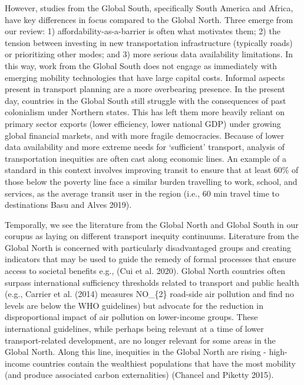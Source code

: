 \documentclass[12pt, oneside]{report}
\begin{document}
However, studies from the Global South, specifically South America and
Africa, have key differences in focus compared to the Global North.
Three emerge from our review: 1) affordability-as-a-barrier is often
what motivates them; 2) the tension between investing in new
transportation infrastructure (typically roads) or prioritizing other
modes; and 3) more serious data availability limitations. In this way,
work from the Global South does not engage as immediately with emerging
mobility technologies that have large capital costs. Informal aspects
present in transport planning are a more overbearing presence. In the
present day, countries in the Global South still struggle with the
consequences of past colonialism under Northern states. This has left
them more heavily reliant on primary sector exports (lower efficiency,
lower national GDP) under growing global financial markets, and with
more fragile democracies. Because of lower data availability and more
extreme needs for `sufficient' transport, analysis of transportation
inequities are often cast along economic lines. An example of a standard
in this context involves improving transit to ensure that at least 60\%
of those below the poverty line face a similar burden travelling to
work, school, and services, as the average transit user in the region
(i.e., 60 min travel time to destinations Basu and Alves 2019).

Temporally, we see the literature from the Global North and Global South
in our corupus as laying on different transport inequity continuums.
Literature from the Global North is concerned with particularly
disadvantaged groups and creating indicators that may be used to guide
the remedy of formal processes that ensure access to societal benefits
e.g., (Cui et al. 2020). Global North countries often surpass
international sufficiency thresholds related to transport and public
health (e.g., Carrier et al. (2014) measures NO\_\{2\} road-side air
pollution and find no levels are below the WHO guidelines) but advocate
for the reduction in disproportional impact of air pollution on
lower-income groups. These international guidelines, while perhaps being
relevant at a time of lower transport-related development, are no longer
relevant for some areas in the Global North. Along this line, inequities
in the Global North are rising - high-income countries contain the
wealthiest populations that have the most mobility (and produce
associated carbon externalities) (Chancel and Piketty 2015).
\end{document}

